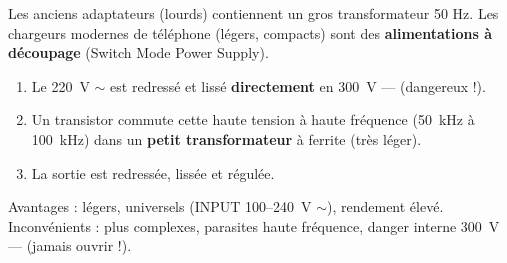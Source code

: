 \documentclass[11pt]{article}
\begin{document}
\begin{savaistu}
Les anciens adaptateurs (lourds) contiennent un gros transformateur 50 Hz. Les chargeurs modernes de téléphone (légers, compacts) sont des \textbf{alimentations à découpage} (Switch Mode Power Supply).
\begin{enumerate}
\item Le \SI{220}{V} $\sim$ est redressé et lissé \textbf{directement} en \SI{300}{V} --- (dangereux !).
\item Un transistor commute cette haute tension à haute fréquence (\SI{50}{kHz} à \SI{100}{kHz}) dans un \textbf{petit transformateur} à ferrite (très léger).
\item La sortie est redressée, lissée et régulée.
\end{enumerate}
Avantages : légers, universels (INPUT 100--\SI{240}{V} $\sim$), rendement élevé. Inconvénients : plus complexes, parasites haute fréquence, danger interne \SI{300}{V} --- (jamais ouvrir !).
\end{savaistu}
\end{document}
